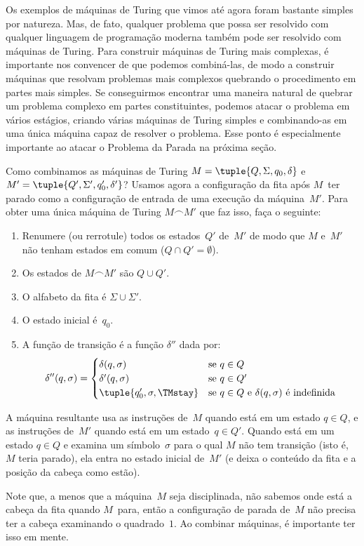 \documentclass[../../../include/open-logic-section]{subfiles}
\begin{document}

\begin{explain}
Os exemplos de máquinas de Turing que vimos até agora foram bastante
simples por natureza. Mas, de fato, qualquer problema que possa ser resolvido com qualquer
linguagem de programação moderna também pode ser resolvido com máquinas de Turing.
Para construir máquinas de Turing mais complexas, é importante nos convencer
de que podemos combiná-las, de modo a construir máquinas que resolvam
problemas mais complexos quebrando o procedimento em partes mais simples.
Se conseguirmos encontrar uma maneira natural de quebrar um problema complexo em
partes constituintes, podemos atacar o problema em vários estágios,
criando várias máquinas de Turing simples e combinando-as em uma única
máquina capaz de resolver o problema. Esse ponto é especialmente importante
ao atacar o Problema da Parada na próxima seção.

Como combinamos as máquinas de Turing $M = \tuple{Q, \Sigma, q_0, \delta}$
e~$M' = \tuple{Q', \Sigma', q_0', \delta'}$?  Usamos agora a
configuração da fita após $M$~ter parado como a configuração de entrada
de uma execução da máquina~$M'$.  Para obter uma única máquina de Turing
$M \frown M'$ que faz isso, faça o seguinte:
\begin{enumerate}
    \item Renumere (ou rerrotule) todos os estados~$Q'$ de~$M'$ de modo que $M$
    e~$M'$ não tenham estados em comum ($Q \cap Q' = \emptyset$).
    \item Os estados de $M \frown M'$ são $Q \cup Q'$.
    \item O alfabeto da fita é $\Sigma \cup \Sigma'$.
    \item O estado inicial é~$q_0$.
    \item A função de transição é a função $\delta''$ dada por:
    \[\delta''(q,\sigma) =
    \begin{cases}
      \delta(q,\sigma) & \text{se $q \in Q$}\\
      \delta'(q,\sigma) & \text{se $q \in Q'$}\\
      \tuple{q_0', \sigma, \TMstay} & \text{se $q \in Q$ e
      $\delta(q,\sigma)$ é indefinida}
    \end{cases}\]
\end{enumerate}
A máquina resultante usa as instruções de~$M$ quando está em um
estado $q \in Q$, e as instruções de~$M'$ quando está em um estado~$q \in
Q'$. Quando está em um estado $q \in Q$ e examina um símbolo~$\sigma$
para o qual $M$ não tem transição (isto é, $M$ teria parado), ela
entra no estado inicial de~$M'$ (e deixa o conteúdo da fita e a posição
da cabeça como estão).

Note que, a menos que a máquina~$M$ seja disciplinada, não sabemos onde
está a cabeça da fita quando $M$~para, então a configuração de parada de~$M$
não precisa ter a cabeça examinando o quadrado~$1$. Ao combinar máquinas,
é importante ter isso em mente.
\end{explain}
\end{document}
